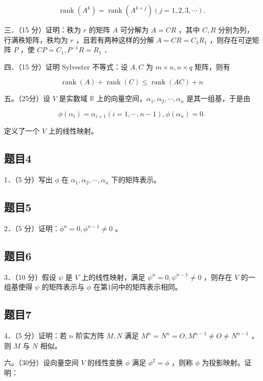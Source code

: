 \documentclass{article}
\begin{document}
\[
\operatorname{rank}\left(A^{k}\right)=\operatorname{rank}\left(A^{k+j}\right)(j=1,2,3, \cdots) .
\]

三．（15 分）证明：秩为 \(r\) 的矩阵 \(A\) 可分解为 \(A=C R\) ，其中 \(C, R\) 分别为列，行满秩矩阵，秩均为 \(r\) ，且若有两种这样的分解 \(A=C R=C_{1} R_{1}\) ，则存在可逆矩阵 \(P\) ，使 \(C P=C_{1}, P^{-1} R=R_{1}\) ．

四．（15 分）证明 Sylvester 不等式：设 \(A, C\) 为 \(m \times n, n \times q\) 矩阵，则有

\[
\operatorname{rank}(A)+\operatorname{rank}(C) \leq \operatorname{rank}(A C)+n
\]

五。（25分）设 \(V\) 是实数域 \(\mathbb{R}\) 上的向量空间，\(\alpha_{1}, \alpha_{2}, \cdots, \alpha_{n}\) 是其一组基，于是由

\[
\phi\left(\alpha_{i}\right)=\alpha_{i+1}(i=1, \cdots, n-1), \phi\left(\alpha_{n}\right)=0 .
\]

定义了一个 \(V\) 上的线性映射。\\

\subsection{题目4}
1．（5 分）写出 \(\phi\) 在 \(\alpha_{1}, \alpha_{2}, \cdots, \alpha_{n}\) 下的矩阵表示。\\

\subsection{题目5}
2．（5 分）证明：\(\phi^{n}=0, \phi^{n-1} \neq 0\) 。\\

\subsection{题目6}
3．（10 分）假设 \(\psi\) 是 \(V\) 上的线性映射，满足 \(\psi^{n}=0, \psi^{n-1} \neq 0\) ，则存在 \(V\) 的一组基使得 \(\psi\) 的矩阵表示与 \(\phi\) 在第1问中的矩阵表示相同。\\

\subsection{题目7}
4．（5 分）证明：若 \(n\) 阶实方阵 \(M, N\) 满足 \(M^{n}=N^{n}=O, M^{n-1} \neq O \neq N^{n-1}\) ，则 \(M\) 与 \(N\) 相似。

六。（30分）设向量空间 \(V\) 的线性变换 \(\phi\) 满足 \(\phi^{2}=\phi\) ，则称 \(\phi\) 为投影映射。证明：\\
\end{document}
